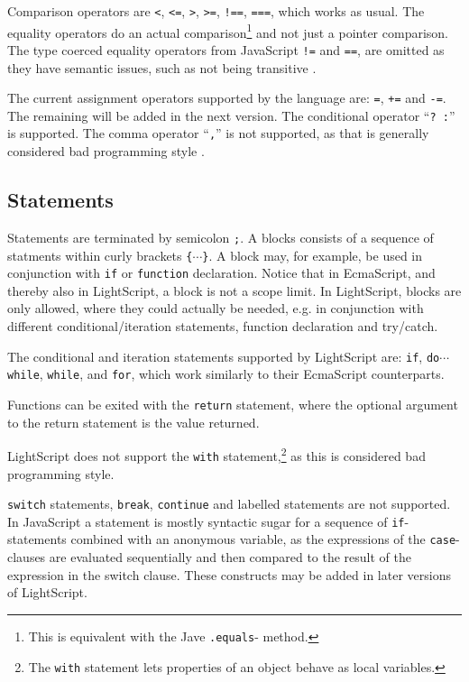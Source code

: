 \documentclass[11pt]{report}
\begin{document}
Comparison operators are \verb|<|, \verb|<=|, \verb|>|, \verb|>=|, \verb|!==|, \verb|===|, which works as usual. The equality operators do an actual comparison\footnote{This is equivalent with the Jave {\tt .equals}- method.} and not just a pointer comparison. 
The type coerced equality operators from JavaScript \verb|!=| and \verb|==|, are omitted 
as they have semantic issues, such as not being transitive \cite{javascript-good-parts}.

The current assignment operators supported by the language are: \verb|=|, \verb|+=| and \verb|-=|.
The remaining will be added in the next version.
The conditional operator ``\verb|? :|'' is supported. The comma operator ``\verb|,|'' is not supported, as that is generally considered bad programming style \cite{crockford-web}.

\subsection{Statements}
Statements are terminated by semicolon \verb|;|.
A blocks consists of a sequence of statments within curly brackets \verb|{|$\cdots$\verb|}|. A block may, for example, be used in conjunction with \verb|if| or \verb|function| declaration. Notice that in EcmaScript, and thereby also in LightScript, a block is not a scope limit. In LightScript, blocks are only allowed, where they could actually be needed, e.g. in conjunction with different conditional/iteration statements, function declaration and try/catch.

The conditional and iteration statements supported by LightScript are: \verb|if|, \verb|do|$\cdots$\verb|while|, \verb|while|, and \verb|for|, which work similarly to their EcmaScript counterparts.

Functions can be exited with the \verb|return| statement, where the optional argument to the return statement is the value returned.

LightScript does not support the \verb|with| statement,\footnote{The {\tt with} statement lets properties of an object behave as local variables.} as this is considered bad programming style.

\verb|switch| statements, \verb|break|, \verb|continue| and labelled statements are not supported. In JavaScript a statement is mostly syntactic sugar for a sequence of \verb|if|-statements combined with an anonymous variable, as the expressions of the \verb|case|-clauses are evaluated sequentially and then compared to the result of the expression in the switch clause.
These constructs may be added in later versions of LightScript.
\end{document}
